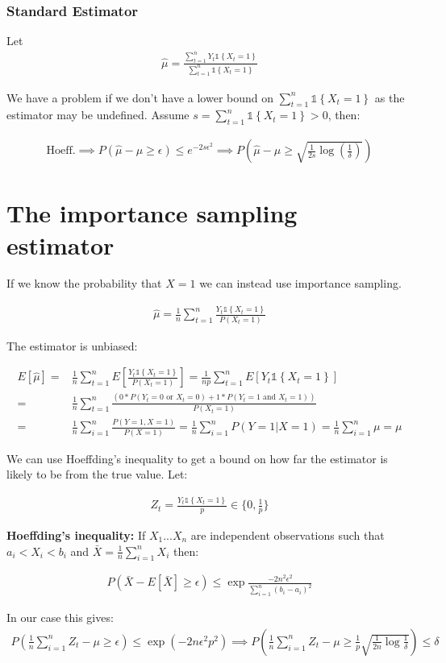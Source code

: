 \documentclass{article}
\newcommand{\set}[1]{\left\{#1\right\}}
\newcommand{\ind}[1]{\mathds{1}\!\!\set{#1}}
\newcommand{\eqn}[1]{\begin{align}#1\end{align}}
\theoremstyle{plain}
\theoremstyle{definition}
\begin{document}
\subsubsection*{Standard Estimator}
Let 
\eqn{
\hat{\mu} = \frac{\sum_{t=1}^n Y_t \ind{X_t=1}}{\sum_{t=1}^n\ind{X_t=1}}
}

We have a problem if we don't have a lower bound on $\sum_{t=1}^n\ind{X_t=1}$ as the estimator may be undefined. Assume $s = \sum_{t=1}^n\ind{X_t=1} > 0$, then:

\eqn{
\text{Hoeff.} \implies P(\hat{\mu} - \mu \geq \epsilon) \leq e^{-2s\epsilon^2}
 \implies P\left(\hat{\mu} - \mu \geq \sqrt{\frac{1}{2s}\log(\frac{1}{\delta})}\right)
}

\section{The importance sampling estimator}
If we know the probability that $X=1$ we can instead use importance sampling.

\eqn{
\hat{\mu} = \frac{1}{n}\sum_{t=1}^n\frac{Y_t \ind{X_t=1}}{P(X_t=1)}
}

The estimator is unbiased:

\eqn{
E[\hat{\mu}] = &\frac{1}{n}\sum_{t=1}^n E\left[\frac{Y_t \ind{X_t=1}}{P(X_t=1)}\right] = \frac{1}{np}\sum_{t=1}^n E\left[Y_t \ind{X_t=1}\right] \\
= & \frac{1}{n} \sum_{t=1}^n \frac{\left( 0*P(Y_t=0 \text{ or } X_t=0) + 1*P(Y_t = 1 \text{ and } X_t=1) \right)}{P(X_t=1)} \\
= & \frac{1}{n}\sum_{i=1}^n\frac{P(Y=1,X=1)}{P(X=1)} = \frac{1}{n}\sum_{i=1}^{n}P(Y=1|X=1) = \frac{1}{n} \sum_{i=1}^n \mu = \mu
}

We can use Hoeffding's inequality to get a bound on how far the estimator is likely to be from the true value. Let:

\eqn{
Z_t = \frac{Y_t \ind{X_t=1}}{p} \in \{0,\frac{1}{p}\}
}

\textbf{Hoeffding's inequality:} If $X_1...X_n$ are independent observations such that $a_i < X_i < b_i$ and $\bar{X} = \frac{1}{n}\sum_{i=1}^n X_i$ then:

\eqn {
P(\bar{X} - E[\bar{X}] \geq \epsilon) \leq \exp{\frac{-2n^2\epsilon^2}{\sum_{i=1}^n(b_i - a_i)^2}}
}

In our case this gives:
\eqn{
P(\frac{1}{n}\sum_{i=1}^n Z_t - \mu \geq \epsilon) \leq \exp{(-2n\epsilon^2p^2)} 
\implies P(\frac{1}{n}\sum_{i=1}^n Z_t - \mu \geq \frac{1}{p}\sqrt{\frac{1}{2n}\log{\frac{1}{\delta}}}) \leq \delta
}
\end{document}
